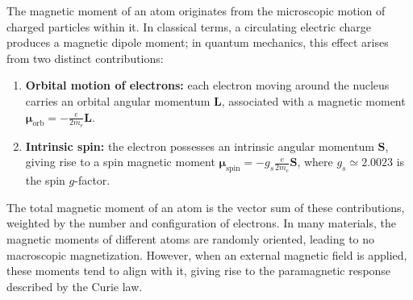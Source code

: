 \begin{remark}
    The magnetic moment of an atom originates from the microscopic motion of charged particles within it.
    In classical terms, a circulating electric charge produces a magnetic dipole moment; in quantum mechanics, this effect arises from two distinct contributions:
    \begin{enumerate}
        \item \textbf{Orbital motion of electrons:} each electron moving around the nucleus carries an orbital angular momentum $\mathbf{L}$, associated with a magnetic moment
              $\boldsymbol{\mu}_{\mathrm{orb}} = -\frac{e}{2m_e}\mathbf{L}$.
        \item \textbf{Intrinsic spin:} the electron possesses an intrinsic angular momentum $\mathbf{S}$, giving rise to a spin magnetic moment
              $\boldsymbol{\mu}_{\mathrm{spin}} = -g_s \frac{e}{2m_e}\mathbf{S}$, where $g_s \simeq 2.0023$ is the spin $g$-factor.
    \end{enumerate}
    The total magnetic moment of an atom is the vector sum of these contributions, weighted by the number and configuration of electrons. In many materials, the magnetic moments of different atoms are randomly oriented, leading to no macroscopic magnetization. However, when an external magnetic field is applied, these moments tend to align with it, giving rise to the paramagnetic response described by the Curie law.
\end{remark}

